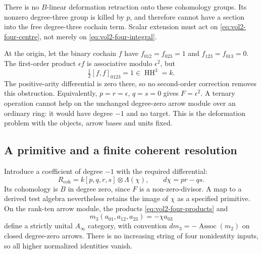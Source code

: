 There is no $B$-linear deformation retraction onto these
cohomology groups. Its nonzero degree-three group is killed
by $p$, and therefore cannot have a section into the free
degree-three cochain term. Scalar extension must act on
\eqref{eq:vol2-four-centre}, not merely on
\eqref{eq:vol2-four-integral}.

At the origin, let the binary cochain $f$ have
$f_{012}=f_{023}=1$ and $f_{123}=f_{013}=0$.
The first-order product $\epsilon f$ is associative modulo
$\epsilon^2$, but
\[
 \tfrac12[f,f]_{0123}=1\in\operatorname{HH}^3=k.
\]
The positive-arity differential is zero there, so no
second-order correction removes this obstruction. Equivalently,
$p=r=\epsilon$, $q=s=0$ gives $F=\epsilon^2$.
A ternary operation cannot help on the unchanged degree-zero
arrow module over an ordinary ring: it would have degree $-1$
and no target. This is the deformation problem with the
objects, arrow bases and units fixed.

\subsection{A primitive and a finite coherent resolution}

Introduce a coefficient of degree $-1$ with the required
differential:
\begin{equation}\label{eq:vol2-four-coherent-base}
 R_{\mathrm{coh}}=k[p,q,r,s]\otimes\Lambda(\chi),
                  \qquad d\chi=pr-qs.
\end{equation}
Its cohomology is $B$ in degree zero, since $F$ is a
non-zero-divisor. A map to a derived test algebra nevertheless
retains the image of $\chi$ as a specified primitive.
On the rank-ten arrow module, the products
\eqref{eq:vol2-four-products} and
\begin{equation}\label{eq:vol2-four-ternary}
 m_3(a_{01},a_{12},a_{23})=-\chi a_{03}
\end{equation}
define a strictly unital $A_\infty$ category, with convention
$dm_3=-\operatorname{Assoc}(m_2)$ on closed degree-zero
arrows. There is no increasing string of four nonidentity
inputs, so all higher normalized identities vanish.

